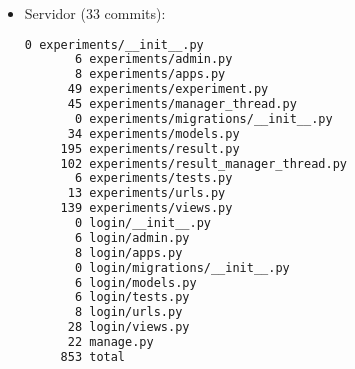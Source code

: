 \begin{itemize}
\item Servidor (33 commits):
    \begin{lstlisting}[language=bash]
       0 experiments/__init__.py
       6 experiments/admin.py
       8 experiments/apps.py
      49 experiments/experiment.py
      45 experiments/manager_thread.py
       0 experiments/migrations/__init__.py
      34 experiments/models.py
     195 experiments/result.py
     102 experiments/result_manager_thread.py
       6 experiments/tests.py
      13 experiments/urls.py
     139 experiments/views.py
       0 login/__init__.py
       6 login/admin.py
       8 login/apps.py
       0 login/migrations/__init__.py
       6 login/models.py
       6 login/tests.py
       8 login/urls.py
      28 login/views.py
      22 manage.py
     853 total
    \end{lstlisting}
\end{itemize}
\newpage